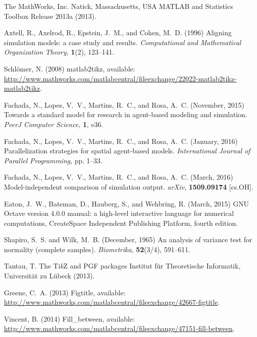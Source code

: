 \documentclass{article}
\begin{document}

\begin{thebibliography}{10}

The MathWorks, Inc. Natick, Massachusetts, USA
{MATLAB} and Statistics Toolbox Release 2013a (2013).

Axtell, R., Axelrod, R., Epstein, J.~M., and Cohen, M.~D. (1996)
Aligning simulation models: a case study and results.
{\em Computational and Mathematical Organization Theory,} {\bf 1}(2), 123--141.

Schl{\"o}mer, N. (2008)
matlab2tikz, available:
  \url{http://www.mathworks.com/matlabcentral/fileexchange/22022-matlab2tikz-matlab2tikz}.

Fachada, N., Lopes, V.~V., Martins, R.~C., and Rosa, A.~C. (November, 2015)
Towards a standard model for research in agent-based modeling and simulation.
{\em PeerJ Computer Science,} {\bf 1}, e36.

Fachada, N., Lopes, V.~V., Martins, R.~C., and Rosa, A.~C. (January, 2016)
Parallelization strategies for spatial agent-based models.
{\em International Journal of Parallel Programming,} pp. 1--33.

Fachada, N., Lopes, V.~V., Martins, R.~C., and Rosa, A.~C. (March, 2016)
Model-independent comparison of simulation output.
{\em arXiv,} {\bf 1509.09174}
[cs.OH].

Eaton, J.~W., Bateman, D., Hauberg, S., and Wehbring, R. (March, 2015)
{GNU Octave} version 4.0.0 manual: a high-level interactive language for
  numerical computations,
CreateSpace Independent Publishing Platform,  fourth edition.

Shapiro, S.~S. and Wilk, M.~B. (December, 1965)
An analysis of variance test for normality (complete samples).
{\em Biometrika,} {\bf 52}(3/4), 591--611.

Tantau, T.
The {Ti\textit{k}Z} and {PGF} packages
Institut f{\"u}r Theoretische Informatik, Universit{\"a}t zu L{\"u}beck (2013).

Greene, C.~A. (2013)
Figtitle, available:
  \url{http://www.mathworks.com/matlabcentral/fileexchange/42667-figtitle}.

Vincent, B. (2014)
Fill\_between, available:
  \url{http://www.mathworks.com/matlabcentral/fileexchange/47151-fill-between}.


\end{thebibliography}
\end{document}
